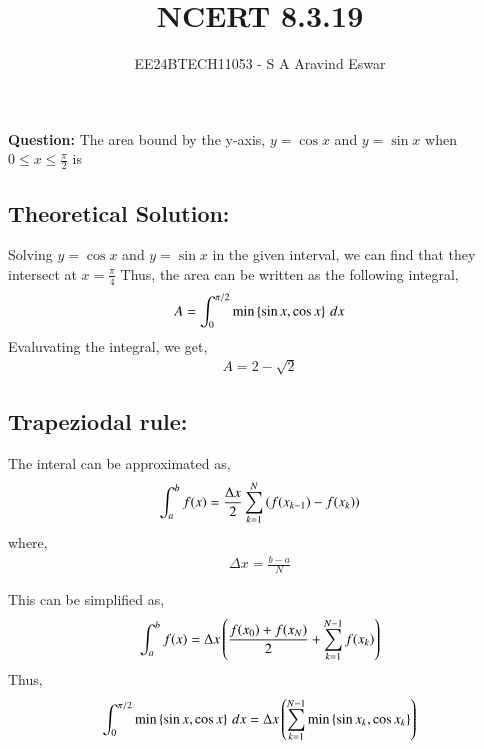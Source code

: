 \documentclass[journal]{IEEEtran}
\begin{document}

\vspace{3cm}

\title{NCERT 8.3.19}
\author{EE24BTECH11053 - S A Aravind Eswar}
{\let\newpage\relax\maketitle}

\renewcommand{\thefigure}{\theenumi}
\renewcommand{\thetable}{\theenumi}
\setlength{\intextsep}{10pt} %

\textbf{Question:} The area bound by the y-axis, $y=\cos{x}$ and $y=\sin{x}$ when $\displaystyle 0\leq x \leq \frac{\pi}{2}$ is

\subsection{Theoretical Solution:}
    Solving $y=\cos{x}$ and $y = \sin{x}$ in the given interval, we can find that they intersect at $x = \frac{\pi}{4}$
    Thus, the area can be written as the following integral,
    \begin{align}
        A = \int_{0}^{\pi/2} \min\left\{\sin{x}, \cos{x}\right\}\, dx
    \end{align}
    Evaluvating the integral, we get,
    \begin{align}
        A = 2 - \sqrt{2}
    \end{align}

\subsection{Trapeziodal rule:}
    The interal can be approximated as,
    \begin{align}
        \int_{a}^{b} f(x) = \frac{\Delta x}{2} \sum_{k=1}^{N} \left(f(x_{k-1}) - f(x_k)\right)
    \end{align}
    where,
    \begin{align}
        \Delta x = \frac{b-a}{N}
    \end{align}

    This can be simplified as,
    \begin{align}
        \int_{a}^{b} f(x) = \Delta x\left(\frac{f(x_0) + f(x_N)}{2}+\sum_{k=1}^{N-1} f(x_k)\right)
    \end{align}
    Thus, 
    \begin{align}
        \int_{0}^{\pi/2} \min\left\{\sin{x},\cos{x}\right\}\,dx = \Delta x\left(\sum_{k=1}^{N-1}\min\left\{\sin{x_k},\cos{x_k}\right\}\right)
    \end{align}
    
\end{document}
